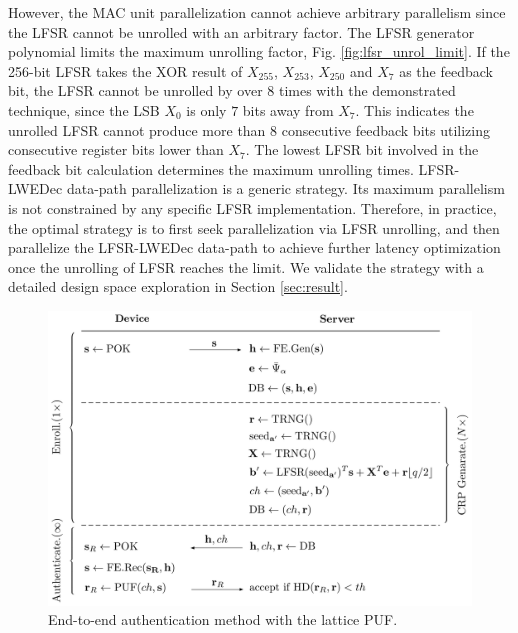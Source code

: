 However, the MAC unit parallelization cannot achieve arbitrary parallelism since the LFSR cannot be unrolled with an arbitrary factor. The LFSR generator polynomial limits the maximum unrolling factor, Fig. \ref{fig:lfsr_unrol_limit}. If the 256-bit LFSR takes the XOR result of $X_{255}$, $X_{253}$, $X_{250}$ and $X_{7}$ as the feedback bit, the LFSR cannot be unrolled by over 8 times with the demonstrated technique, since the LSB $X_{0}$ is only $7$ bits away from $X_{7}$. This indicates the unrolled LFSR cannot produce more than $8$ consecutive feedback bits utilizing consecutive register bits lower than $X_{7}$. The lowest LFSR bit involved in the feedback bit calculation determines the maximum unrolling times. LFSR-LWEDec data-path parallelization is a generic strategy. Its maximum parallelism is not constrained by any specific LFSR implementation. Therefore, in practice, the optimal strategy is to first seek parallelization via LFSR unrolling, and then parallelize the LFSR-LWEDec data-path to achieve further latency optimization once the unrolling of LFSR reaches the limit. We validate the strategy with a detailed design space exploration in Section \ref{sec:result}.


\begin{figure}[t!]
\centering
\includegraphics[width = 1.0\linewidth]{./figs/protocol}
\caption{End-to-end authentication method with the lattice PUF.}
\label{fig:protocol}
\end{figure}

